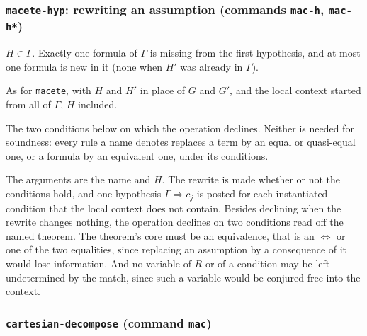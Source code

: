 \subsubsection*{\texttt{macete-hyp}: rewriting an assumption
  (commands \texttt{mac-h}, \texttt{mac-h*})}

\label{kop:macete-hyp}%
\begin{VNBcond}
\item[Assumption] $H \in \Gamma$.  Exactly one formula of $\Gamma$ is
  missing from the first hypothesis, and at most one formula is new in
  it (none when $H'$ was already in $\Gamma$).
\item[Licence, Tag, Rewrite, Conditions] As for \texttt{macete}, with
  $H$ and $H'$ in place of $G$ and $G'$, and the local context started
  from all of $\Gamma$, $H$ included.
\item[Not checked] The two conditions below on which the operation
  declines.  Neither is needed for soundness: every rule a name denotes
  replaces a term by an equal or quasi-equal one, or a formula by an
  equivalent one, under its conditions.
\end{VNBcond}
The arguments are the name and $H$.  The rewrite is made whether or not
the conditions hold, and one hypothesis $\Gamma \Longrightarrow c_j$ is
posted for each instantiated condition that the local context does not
contain.  Besides declining when the rewrite changes nothing, the
operation declines on two conditions read off the named theorem.  The
theorem's core must be an equivalence, that is an $\Leftrightarrow$ or
one of the two equalities, since replacing an assumption by a
consequence of it would lose information.  And no variable of $R$ or of
a condition may be left undetermined by the match, since such a variable
would be conjured free into the context.

\subsubsection*{\texttt{cartesian-decompose} (command \texttt{mac})}

